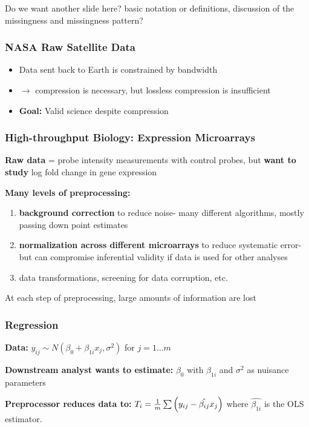 \documentclass[10pt, compress]{beamer}
\begin{document}
\begin{frame}[fragile]
    Do we want another slide here? basic notation or definitions, discussion of the missingness and missingness pattern?

\end{frame}

\begin{frame}[fragile]
    \frametitle{NASA Raw Satellite Data}
    \begin{itemize}
        \item Data sent back to Earth is constrained by bandwidth
        \item $\rightarrow$ compression is necessary, but lossless compression is insufficient
        \item \textbf{Goal:} Valid science despite compression
    \end{itemize}
\end{frame}

\begin{frame}[fragile]
    \frametitle{High-throughput Biology: Expression Microarrays}
    
    \textbf{Raw data} = probe intensity measurements with control probes, but \textbf{want to study} log fold change in gene expression
    
    \textbf{Many levels of preprocessing:} 

    \begin{enumerate} [<+->]
    \item \textbf{background correction} to reduce noise- many different algorithms, mostly passing down point estimates
    \vspace*{5mm}
    \item \textbf{normalization across different microarrays} to reduce systematic error- but can compromise inferential validity if data is used for other analyses
    \vspace*{5mm}
    \item data transformations, screening for data corruption, etc.
    \end{enumerate}
    
    At each step of preprocessing, large amounts of information are lost

\end{frame}

\begin{frame}[fragile]
    \frametitle{Regression}
    
    \textbf{Data:} $y_{ij} \sim N(\beta_0 + \beta_{1i}x_j, \sigma^2)$ for $j = 1 \ldots m$
    
    \textbf{Downstream analyst wants to estimate:} $\beta_0$ with $\beta_{1i}$ and $\sigma^2$ as nuisance parameters
    
    \textbf{Preprocessor reduces data to:} $T_i = \frac{1}{m}\sum\del{y_{ij} - \hat{\beta_{ij}}x_j}$ where $\hat{\beta_{1i}}$ is the OLS estimator.

\end{frame}
\end{document}

